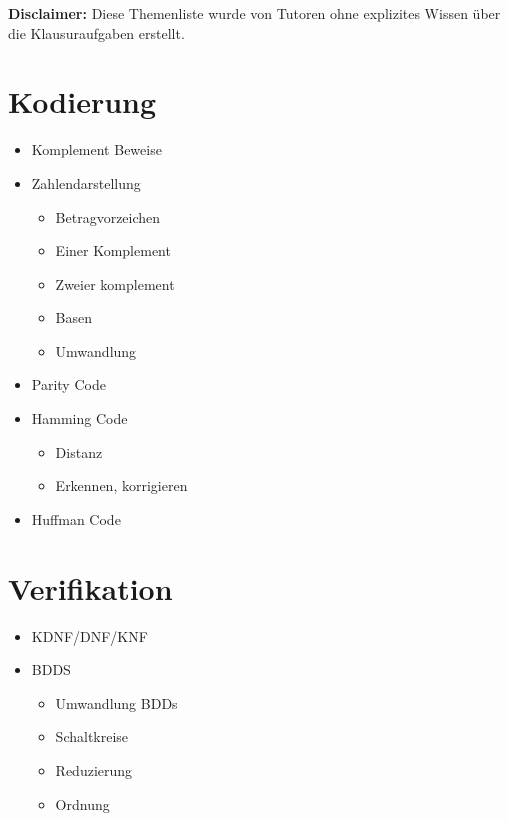 \documentclass{scrartcl}[9pt, a4paper]
\begin{document}
\textbf{Disclaimer:} Diese Themenliste wurde von Tutoren ohne explizites Wissen über die Klausuraufgaben erstellt.

\section*{Kodierung}

\begin{itemize}
	\item Komplement Beweise
	\item Zahlendarstellung
	      \begin{itemize}
	      	\item Betragvorzeichen
	      	\item Einer Komplement
	      	\item Zweier komplement
	      	\item Basen
	      	\item Umwandlung
	      \end{itemize}
	\item Parity Code
	\item Hamming Code
	      \begin{itemize}
	      	\item Distanz
	      	\item Erkennen, korrigieren
	      \end{itemize}
	\item Huffman Code
\end{itemize}

\section*{Verifikation}

\begin{itemize}
	\item KDNF/DNF/KNF
	\item BDDS
	      \begin{itemize}
	      	\item Umwandlung BDDs \item Schaltkreise
	      	\item Reduzierung
	      	\item Ordnung
	      \end{itemize}
\end{itemize}

\pagebreak
\end{document}
